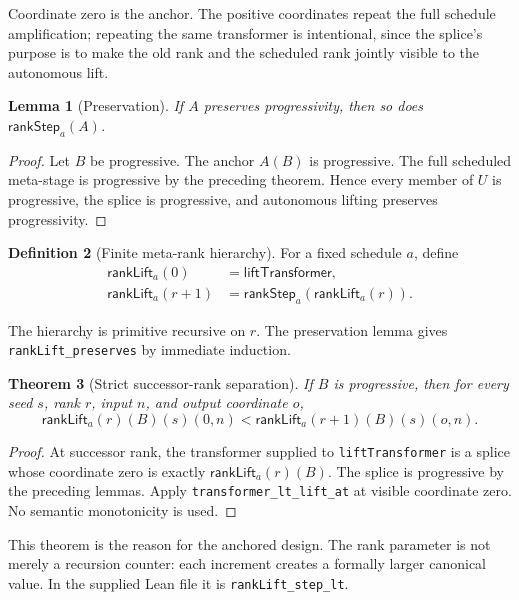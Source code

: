 \documentclass[11pt]{article}
\newtheorem{theorem}{Theorem}[section]
\newtheorem{lemma}[theorem]{Lemma}
\theoremstyle{definition}
\newtheorem{definition}[theorem]{Definition}
\theoremstyle{remark}
\newcommand{\lean}[1]{\texttt{#1}}
\begin{document}
Coordinate zero is the anchor.  The positive coordinates repeat the full
schedule amplification; repeating the same transformer is intentional, since
the splice's purpose is to make the old rank and the scheduled rank jointly
visible to the autonomous lift.

\begin{lemma}[Preservation]
If \(A\) preserves progressivity, then so does
\(\mathsf{rankStep}_a(A)\).
\end{lemma}

\begin{proof}
Let \(B\) be progressive.  The anchor \(A(B)\) is progressive.  The full
scheduled meta-stage is progressive by the preceding theorem.  Hence every member of \(U\) is progressive, the splice is
progressive, and autonomous lifting preserves progressivity.
\end{proof}

\begin{definition}[Finite meta-rank hierarchy]
For a fixed schedule \(a\), define
\[
\begin{aligned}
  \mathsf{rankLift}_a(0)&=\mathsf{liftTransformer},\\
  \mathsf{rankLift}_a(r+1)&=
    \mathsf{rankStep}_a(\mathsf{rankLift}_a(r)).
\end{aligned}
\]
\end{definition}

The hierarchy is primitive recursive on \(r\).  The preservation lemma gives
\lean{rankLift\_preserves} by immediate induction.

\begin{theorem}[Strict successor-rank separation]
\label{thm:rank-step}
If \(B\) is progressive, then for every seed \(s\), rank \(r\), input \(n\),
and output coordinate \(o\),
\[
\mathsf{rankLift}_a(r)(B)(s)(0,n)
<
\mathsf{rankLift}_a(r+1)(B)(s)(o,n).
\]
\end{theorem}

\begin{proof}
At successor rank, the transformer supplied to
\lean{liftTransformer} is a splice whose coordinate zero is exactly
\(\mathsf{rankLift}_a(r)(B)\).  The splice is progressive by the preceding
lemmas.  Apply \lean{transformer\_lt\_lift\_at} at visible coordinate zero.
No semantic monotonicity is used.
\end{proof}

This theorem is the reason for the anchored design.  The rank parameter is not
merely a recursion counter: each increment creates a formally larger canonical
value.  In the supplied Lean file it is
\lean{rankLift\_step\_lt}.
\end{document}
